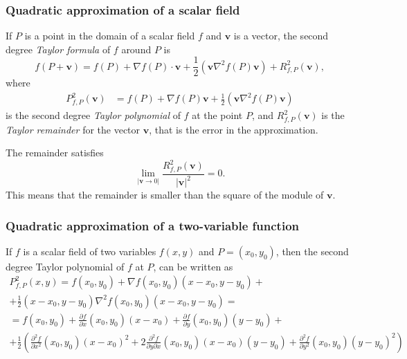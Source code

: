 \begin{frame}
\frametitle{Quadratic approximation of a scalar field}
If $P$ is a point in the domain of a scalar field $f$ and $\mathbf{v}$ is a vector, the second degree \emph{Taylor formula} of $f$ around $P$ is
\[
f(P+\mathbf{v}) = f(P) + \nabla f(P)\cdot \mathbf{v} + \frac{1}{2}\left(\mathbf{v}\nabla^2f(P)\mathbf{v}\right) + R^2_{f,P}(\mathbf{v}),
\]
where
\begin{align*}
P^2_{f,P}(\mathbf{v})&=f(P)+\nabla f(P)\mathbf{v}+\frac{1}{2}\left(\mathbf{v}\nabla^2f(P)\mathbf{v}\right)
\end{align*}
is the second degree \emph{Taylor polynomial} of $f$ at the point $P$, and $R^2_{f,P}(\mathbf{v})$ is the \emph{Taylor remainder} for the vector $\mathbf{v}$, that is the error in the approximation.

The remainder satisfies
\[
\lim_{|\mathbf{v}\rightarrow 0|} \frac{R^2_{f,P}(\mathbf{v})}{|\mathbf{v}|^2} = 0.
\]
This means that the remainder is smaller than the square of the module of $\mathbf{v}$.
\end{frame}


\begin{frame}
\frametitle{Quadratic approximation of a two-variable function}
If $f$ is a scalar field of two variables $f(x,y)$ and $P=(x_0,y_0)$, then the second degree Taylor polynomial of $f$ at $P$, can be written as
\begin{multline*}
P^2_{f,P}(x,y) = f(x_0,y_0)+\nabla f(x_0,y_0)(x-x_0,y-y_0) +\\
+\frac{1}{2}(x-x_0,y-y_0)\nabla^2f(x_0,y_0)(x-x_0,y-y_0)= \\
= f(x_0,y_0)+\frac{\partial f}{\partial x}(x_0,y_0)(x-x_0)+\frac{\partial f}{\partial y}(x_0,y_0)(y-y_0)+\\
+\frac{1}{2}\left(\frac{\partial^2 f}{\partial x^2}(x_0,y_0) (x-x_0)^2 + 2\frac{\partial^2 f}{\partial y\partial x}(x_0,y_0) (x-x_0)(y-y_0) + \frac{\partial^2 f}{\partial y^2}(x_0,y_0) (y-y_0)^2\right)
\end{multline*}
\end{frame}


